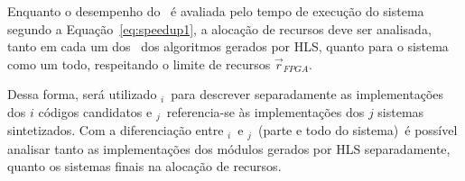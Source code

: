         Enquanto o desempenho do \wearable\ é avaliada pelo tempo de execução do sistema segundo a Equação~\ref{eq:speedup1}, a alocação de recursos deve ser analisada, tanto em cada um dos \hardwares\ dos algoritmos gerados por HLS, quanto para o sistema como um todo, respeitando o limite de recursos $ \vec{r}_{FPGA}$.
        
        Dessa forma, será utilizado \A$_{i}$\ para descrever separadamente as implementações dos $i$ códigos candidatos e \Ss$_{j}$\ referencia-se às implementações dos $j$ sistemas sintetizados.
        Com a diferenciação entre \A$_{i}$\ e \Ss$_{j}$\ (parte e todo do sistema)\ é possível analisar tanto as implementações dos módulos gerados por HLS separadamente, quanto os sistemas finais na alocação de recursos.
        
        
        
        
        
        
        
        
        
        
        
        
        
        
